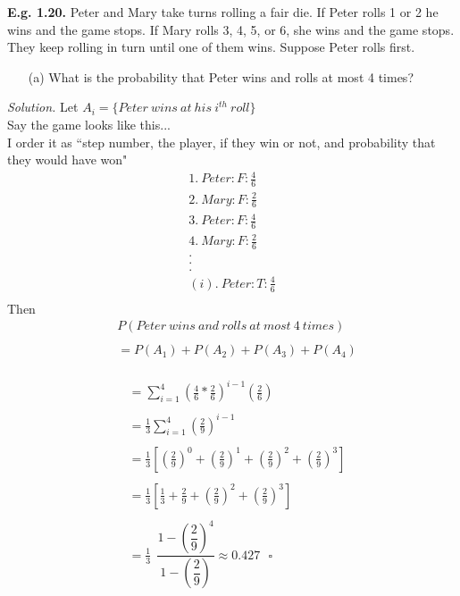 \documentclass[12pt]{book}
\begin{document}
\noindent \textbf{E.g. 1.20. } Peter and Mary take turns rolling a fair die. If Peter rolls 1 or 2 he wins and the game stops. If Mary rolls 3, 4, 5, or 6, she wins and the game stops. They keep rolling in turn until one of them wins. Suppose Peter rolls first.
\begin{itemize}\item [(a)] What is the probability that Peter wins and rolls at most 4 times?\end{itemize}
\newpage \textit{Solution. } 
Let $A_i=\{Peter~wins~at~his~i^{th}~roll\}$\\
Say the game looks like this...\\
I order it as ``step number, the player, if they win or not, and probability that they would have won"\\
$$\begin{aligned}
1.~Peter : F : \frac{4}{6}\\
2.~Mary : F : \frac{2}{6}\\
3.~Peter : F : \frac{4}{6}\\
4.~Mary : F : \frac{2}{6}\\
.\\
.\\
.\\
(i).~Peter : T : \frac{4}{6}\\
\end{aligned} $$
Then 
\begin{align*}
&P(Peter~wins~and~rolls~at~most~4~times)\\\\
&=P(A_{1}) + P(A_{2}) + P(A_{3}) + P(A_{4}) \\\\
\end{align*}
\begin{align*}
\\&=\displaystyle\sum\limits_{i=1}^{4} \left(\frac{4}{6}* \frac{2}{6}\right)^{i-1} \left(\frac{2}{6}\right)\\\\
&=\frac{1}{3}\sum\limits_{i=1}^{4} \left(\frac{2}{9}\right)^{i-1}\\\\
&=\frac{1}{3} \left[ \left(\frac{2}{9}\right)^{0} + \left(\frac{2}{9}\right)^{1}+ \left(\frac{2}{9}\right)^{2} + \left(\frac{2}{9}\right)^{3} \right] \\\\
&=\frac{1}{3} \left[ \frac{1}{3} + \frac{2}{9} + \left(\frac{2}{9}\right)^{2} + \left(\frac{2}{9}\right)^{3} \right] \\\\
&=\frac{1}{3} ~~\dfrac{1-\left(\dfrac{2}{9}\right)^{4}}{1-\left(\dfrac{2}{9}\right)} \approx 0.427~~~\square
\end{align*}
\end{document}
